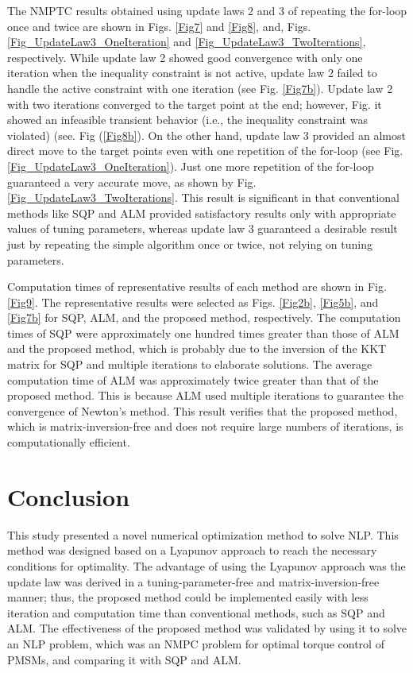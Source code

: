 \documentclass[journal]{IEEEtranTIE}
\begin{document}
The NMPTC results obtained using update laws 2 and 3 of repeating the for-loop once and twice are shown in Figs. \ref{Fig7} and \ref{Fig8}, and, Figs. \ref{Fig_UpdateLaw3_OneIteration} and \ref{Fig_UpdateLaw3_TwoIterations}, respectively. While update law 2 showed good convergence with only one iteration when the inequality constraint is not active, update law 2 failed to handle the active constraint with one iteration (see Fig. \ref{Fig7b}). Update law 2 with two iterations converged to the target point at the end; however, Fig. it showed an infeasible transient behavior (i.e., the inequality constraint was violated) (see. Fig (\ref{Fig8b}). On the other hand, update law 3 provided an almost direct move to the target points even with one repetition of the for-loop (see Fig. \ref{Fig_UpdateLaw3_OneIteration}). Just one more repetition of the for-loop guaranteed a very accurate move, as shown by Fig. \ref{Fig_UpdateLaw3_TwoIterations}. This result is significant in that conventional methods like SQP and ALM provided satisfactory results only with appropriate values of tuning parameters, 
whereas update law 3 guaranteed a desirable result just by repeating the simple algorithm once or twice, not relying on tuning parameters.

Computation times of representative results of each method are shown in Fig. \ref{Fig9}. The representative results were selected as Figs. \ref{Fig2b}, \ref{Fig5b}, and \ref{Fig7b} for SQP, ALM, and the proposed method, respectively. The computation times of SQP were approximately one hundred times greater than those of ALM and the proposed method, which is probably due to the inversion of the KKT matrix for SQP and multiple iterations to elaborate solutions. The average computation time of ALM was approximately twice greater than that of the proposed method. This is because ALM used multiple iterations to guarantee the convergence of Newton's method. This result verifies that the proposed method, which is matrix-inversion-free and does not require large numbers of iterations, is computationally efficient.


\section{Conclusion}

This study presented a novel numerical optimization method to solve NLP. This method was designed based on a Lyapunov approach to reach the necessary conditions for optimality. The advantage of using the Lyapunov approach was the update law was derived in a tuning-parameter-free and matrix-inversion-free manner; thus, the proposed method could be implemented easily with less iteration and computation time than conventional methods, such as SQP and ALM. The effectiveness of the proposed method was validated by using it to solve an NLP problem, which was an NMPC problem for optimal torque control of PMSMs, and comparing it with SQP and ALM.
\end{document}
